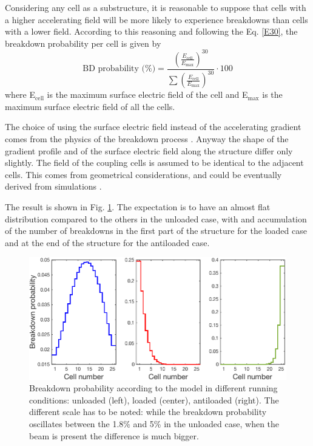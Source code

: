 Considering any cell as a substructure, it is reasonable to suppose that cells with a higher accelerating field will be more likely to experience breakdowns than cells with a lower field. According to this reasoning and following the Eq. \ref{E30}, the breakdown probability per cell is given by
\begin{equation}
\text{BD probability (\%)} =\frac{   \left ( \frac{E_\text{cell}}{E_\text{max}} \right )^{30} }{ \sum \left( \frac{E_\text{cell}}{E_\text{max}} \right )^{30}   } \cdot 100
\end{equation}
where E$_\text{cell}$ is the maximum surface electric field of the cell and E$_\text{max}$ is the maximum surface electric field of all the cells. 

The choice of using the surface electric field instead of the accelerating gradient comes from the physics of the breakdown process \cite{Walter:PC}. Anyway the shape of the gradient profile and of the surface electric field along the structure differ only slightly. The field of the coupling cells is assumed to be identical to the adjacent cells. This comes from geometrical considerations, and could be eventually derived from simulations \cite{Alexej:PC}.

The result is shown in Fig. \ref{BD_prob}. The expectation is to have an almost flat distribution compared to the others in the unloaded case, with and accumulation of the number of breakdowns in the first part of the structure for the loaded case and at the end of the structure for the antiloaded case.


\begin{figure}[h]
\centering 
\includegraphics[scale=0.45]{pictures/BD_probability.png}
\caption{Breakdown probability according to the model in different running conditions: unloaded (left), loaded (center), antiloaded (right). The different scale has to be noted: while the breakdown probability oscillates between the 1.8\% and 5\% in the unloaded case, when the beam is present the difference is much bigger.}
\label{BD_prob}
\end{figure}



